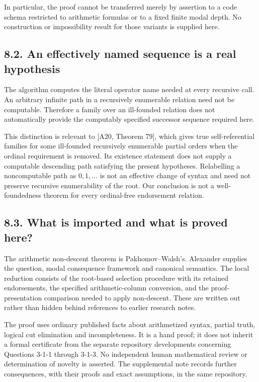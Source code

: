 \documentclass[
  11pt,
  letterpaper,
]{article}
\begin{document}
In particular, the proof cannot be transferred merely by assertion to a
code schema restricted to arithmetic formulas or to a fixed finite modal
depth. No construction or impossibility result for those variants is
supplied here.

\subsection{8.2. An effectively named sequence is a real
hypothesis}\label{an-effectively-named-sequence-is-a-real-hypothesis}

The algorithm computes the literal operator name needed at every
recursive call. An arbitrary infinite path in a recursively enumerable
relation need not be computable. Therefore a family over an ill-founded
relation does not automatically provide the computably specified
successor sequence required here.

This distinction is relevant to {[}A20, Theorem 79{]}, which gives true
self-referential families for some ill-founded recursively enumerable
partial orders when the ordinal requirement is removed. Its existence
statement does not supply a computable descending path satisfying the
present hypotheses. Relabelling a noncomputable path as \(0,1,\ldots\)
is not an effective change of syntax and need not preserve recursive
enumerability of the root. Our conclusion is not a well-foundedness
theorem for every ordinal-free endorsement relation.

\subsection{8.3. What is imported and what is proved
here?}\label{what-is-imported-and-what-is-proved-here}

The arithmetic non-descent theorem is Pakhomov--Walsh's. Alexander
supplies the question, modal consequence framework and canonical
semantics. The local reduction consists of the root-based selection
procedure with its retained endorsements, the specified
arithmetic-column conversion, and the proof-presentation comparison
needed to apply non-descent. These are written out rather than hidden
behind references to earlier research notes.

The proof uses ordinary published facts about arithmetized syntax,
partial truth, logical cut elimination and incompleteness. It is a hand
proof; it does not inherit a formal certificate from the separate
repository developments concerning Questions 3-1-1 through 3-1-3. No
independent human mathematical review or determination of novelty is
asserted. The supplemental note records further consequences, with their
proofs and exact assumptions, in the same repository.
\end{document}
